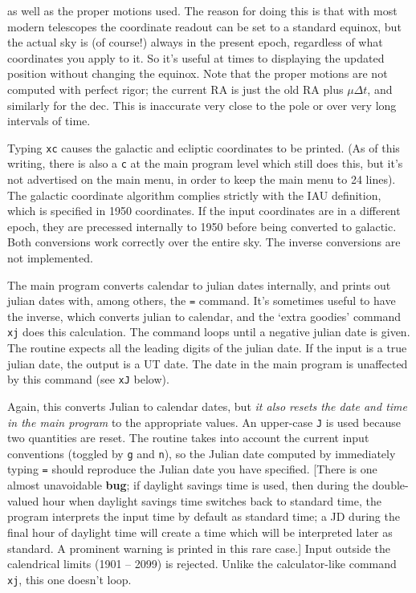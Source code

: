as well as the proper motions used.  The reason for doing this is that
with most modern telescopes the coordinate readout can be set to a 
standard equinox, but the actual sky is (of course!) always in the present 
epoch, regardless of what coordinates you apply to it.  So it's
useful at times to displaying the updated position
without changing the equinox.  Note that the proper motions
are not computed with perfect rigor; the current RA is just the
old RA plus $\mu \Delta t$, and similarly for the dec.  This is
inaccurate very close
to the pole or over very long intervals of time.
\par
{}
\par
Typing {\tt xc} causes the galactic and ecliptic coordinates to be printed.
(As of this writing, there is also a {\tt c} at the main program level
which still does this, but it's not advertised on the main menu,
in order to keep the main menu to 24 lines).
The galactic coordinate algorithm complies strictly with the IAU definition,
which is specified in 1950 coordinates.
If the input coordinates are in a different epoch,
they are precessed internally
to 1950 before being converted to galactic. 
Both conversions work correctly over the entire sky.  
The inverse conversions are not implemented.
\par
{}
\par
The main program converts calendar to julian dates internally, and 
prints out julian dates with, among others, the {\tt =}
command.  It's sometimes useful to have the inverse,
which converts julian to calendar, 
and the `extra goodies' command {\tt xj} does this calculation.
The command loops until a negative julian date is given.  The routine expects
all the leading digits of the julian date.  If the input is a true
julian date, the output is a UT date.  
The date in the main program is unaffected by this command (see {\tt xJ}
below).
\par
{}
\par
Again, this converts Julian to calendar dates, but {\it it also resets the
date and time in the main program} to the appropriate values.
An upper-case {\tt J} is used because two quantities are reset.
The routine takes into account the current input conventions
(toggled by {\tt g} and {\tt n}), so 
the Julian date computed by immediately typing {\tt =} should reproduce
the Julian date you have specified.  [There is one almost unavoidable
{\bf bug}; if daylight savings time is used, then during the double-valued 
hour when daylight savings time switches back to standard time, the program 
interprets the input time by default as standard time; a  
JD during the final hour of daylight time will create
a time which will be interpreted later as standard.  A prominent warning 
is printed in this rare case.] 
Input outside the calendrical limits (1901 -- 2099) is rejected.  Unlike
the calculator-like command {\tt xj}, this one doesn't loop.


